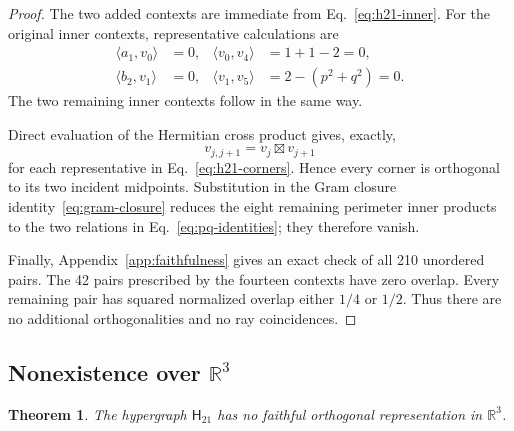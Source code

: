 \documentclass[twocolumn,aps,pra,floatfix,amsmath,amssymb,longbibliography]{revtex4-2}
\newtheorem{theorem}{Theorem}
\theoremstyle{definition}
\theoremstyle{remark}
\newcommand{\R}{\mathbb R}
\newcommand{\Htwentyone}{\mathsf H_{21}}
\begin{document}
\begin{proof}
The two added contexts are immediate from Eq.~\eqref{eq:h21-inner}.
For the original inner contexts, representative calculations are
\begin{align*}
 \langle a_1,v_0\rangle&=0,&
 \langle v_0,v_4\rangle&=1+1-2=0,\\
 \langle b_2,v_1\rangle&=0,&
 \langle v_1,v_5\rangle&=2-(p^2+q^2)=0.
\end{align*}
The two remaining inner contexts follow in the same way.

Direct evaluation of the Hermitian cross product gives, exactly,
\[
 v_{j,j+1}=v_j\boxtimes v_{j+1}
\]
for each representative in Eq.~\eqref{eq:h21-corners}.  Hence every
corner is orthogonal to its two incident midpoints.  Substitution in the
Gram closure identity~\eqref{eq:gram-closure} reduces the eight remaining
perimeter inner products to the two relations in
Eq.~\eqref{eq:pq-identities}; they therefore vanish.

Finally, Appendix~\ref{app:faithfulness} gives an exact check of all 210
unordered pairs.  The 42 pairs prescribed by the fourteen contexts have
zero overlap.  Every remaining pair has squared normalized overlap
either $1/4$ or $1/2$.  Thus there are no additional orthogonalities and
no ray coincidences.
\end{proof}

\subsection{Nonexistence over \texorpdfstring{$\R^3$}{R3}}

\begin{theorem}
\label{thm:h21-real}
The hypergraph $\Htwentyone$ has no faithful orthogonal representation
in $\R^3$.
\end{theorem}
\end{document}
